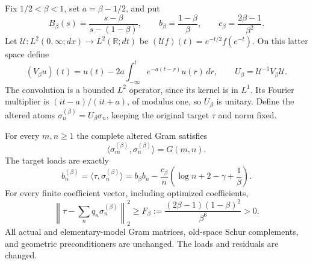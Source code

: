 Fix $1/2<\beta<1$, set $a=\beta-1/2$, and put
\[
 B_\beta(s)=\frac{s-\beta}{s-(1-\beta)},\qquad
 b_\beta=\frac{1-\beta}{\beta},\qquad
 c_\beta=\frac{2\beta-1}{\beta^2}.
\]
Let $\mathcal U:L^2(0,\infty;dx)\to L^2(\mathbb R;dt)$ be
$(\mathcal Uf)(t)=e^{-t/2}f(e^{-t})$. On this latter space define
\[
 (V_\beta u)(t)=u(t)-2a\int_{-\infty}^t
                                      e^{-a(t-r)}u(r)\,dr,
 \qquad U_\beta=\mathcal U^{-1}V_\beta\mathcal U.
\]
The convolution is a bounded $L^2$ operator, since its kernel is in
$L^1$. Its Fourier multiplier is $(it-a)/(it+a)$, of modulus one,
so $U_\beta$ is unitary. Define the altered atoms
$\sigma_n^{(\beta)}=U_\beta\sigma_n$, keeping the original target
$\tau$ and norm fixed.

\begin{proposition}
\label{prop:ns74-same-gram}
For every $m,n\geq1$ the complete altered Gram satisfies
\[
 \langle\sigma_m^{(\beta)},\sigma_n^{(\beta)}\rangle=G(m,n).
\]
The target loads are exactly
\begin{equation}
 b_n^{(\beta)}=\langle\tau,\sigma_n^{(\beta)}\rangle
 =b_\beta b_n-\frac{c_\beta}{n}
                    \left(\log n+2-\gamma+\frac1\beta\right).
 \label{eq:ns74-loads}
\end{equation}
For every finite coefficient vector, including optimized coefficients,
\begin{equation}
 \left\|\tau-\sum_n q_n\sigma_n^{(\beta)}\right\|_2^2
 \geq F_\beta:=\frac{(2\beta-1)(1-\beta)^2}{\beta^6}>0.
 \label{eq:ns74-floor}
\end{equation}
All actual and elementary-model Gram matrices, old-space Schur
complements, and geometric preconditioners are unchanged. The loads
and residuals are changed.
\end{proposition}
